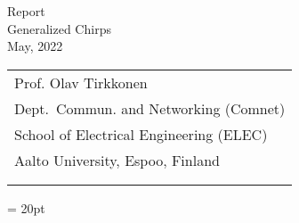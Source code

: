 \begin{center}
	{\huge Report}\\	
	\vspace{0.5cm}
	{\Large Generalized Chirps}\\
	\vspace{0.25cm}
	{\large May, 2022}\\
\end{center}
\vspace{0.5in}
\noindent
\begin{tabular}{l}
	Prof. Olav Tirkkonen \\
	Dept.\ Commun. and Networking (Comnet)   \\
	School of Electrical Engineering (ELEC)   \\
	Aalto University, Espoo, Finland\\
	\\
	\\
\end{tabular}
\baselineskip = 20pt